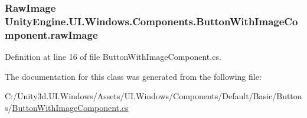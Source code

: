 \subsubsection[{raw\+Image}]{\setlength{\rightskip}{0pt plus 5cm}Raw\+Image Unity\+Engine.\+U\+I.\+Windows.\+Components.\+Button\+With\+Image\+Component.\+raw\+Image}\label{class_unity_engine_1_1_u_i_1_1_windows_1_1_components_1_1_button_with_image_component_aec3c2565eb2423f8cc10334cb58940f4}


Definition at line 16 of file Button\+With\+Image\+Component.\+cs.



The documentation for this class was generated from the following file\+:\begin{DoxyCompactItemize}
\item 
C\+:/\+Unity3d.\+U\+I.\+Windows/\+Assets/\+U\+I.\+Windows/\+Components/\+Default/\+Basic/\+Buttons/\hyperlink{_button_with_image_component_8cs}{Button\+With\+Image\+Component.\+cs}\end{DoxyCompactItemize}
